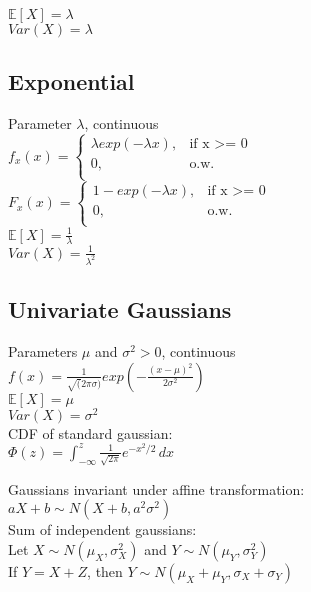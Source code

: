 $\mathbb{E}[X]=\lambda$\\
$Var(X)=\lambda$\\

\subsection*{Exponential}
Parameter $\lambda$, continuous\\
$ f_x(x)=
	\begin{cases}
		 \lambda exp(-\lambda x),&\text{if x >= 0}\\
		0,&\text{o.w.}\\
	\end{cases}
$\\
$ F_x(x)=
	\begin{cases}
		 1-exp(-\lambda x),&\text{if x >= 0}\\
		0,&\text{o.w.}\\
	\end{cases}
$\\

$\mathbb{E}[X]=\frac{1}{\lambda}$\\
$Var(X)=\frac{1}{\lambda^2}$\\

\subsection*{Univariate Gaussians}
Parameters $\mu$ and $\sigma^2 >0$, continuous\\
$f(x)= \frac{1}{\sqrt(2 \pi \sigma)} exp(-\frac{(x-\mu)^2}{2\sigma^2})$ \\
$\mathbb{E}[X]=\mu$ \\
$Var(X)=\sigma^2$\\

CDF of standard gaussian:\\

$\Phi (z) = \int _{-\infty }^ z \frac{1}{\sqrt{2 \pi }} e^{-x^2/2} \,  dx$

Gaussians invariant under affine transformation:\\

$aX+b \sim N(X+b,a^2\sigma^2)$\\

Sum of independent gaussians:\\

Let $X {\sim} N(\mu_X,\sigma_X^2)$ and $Y {\sim} N(\mu_Y,\sigma_Y^2)$\\

If $Y = X + Z$, then $Y \sim N(\mu_X + \mu_Y, \sigma_X + \sigma_Y)$\\

